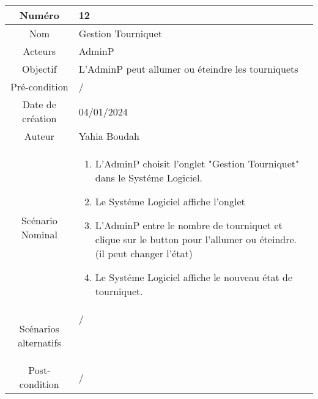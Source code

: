 

\begin{tabular}{ |c|p{12cm}| }
    \hline
    Numéro & 12 \\
    \hline
    Nom & Gestion Tourniquet \\
    \hline
    Acteurs & AdminP \\ 
    \hline
    Objectif & L'AdminP peut allumer ou éteindre les tourniquets \\ 
    \hline
    Pré-condition & / \\
    \hline
    Date de création & 04/01/2024 \\
    \hline
    Auteur & Yahia Boudah \\
    \hline
    Scénario Nominal & \begin{enumerate}
        \item L'AdminP choisit l'onglet "Gestion Tourniquet" dans le Systéme Logiciel.
        \item Le Systéme Logiciel affiche l'onglet
        \item L'AdminP entre le nombre de tourniquet et clique sur le button pour l'allumer ou éteindre. (il peut changer l'état)
        \item Le Systéme Logiciel affiche le nouveau état de tourniquet. 
    \end{enumerate} \\
    \hline
    Scénarios alternatifs & \begin{description}
        \item[/]
    \end{description} \\
    \hline
    Post-condition & / \\
    \hline
\end{tabular}